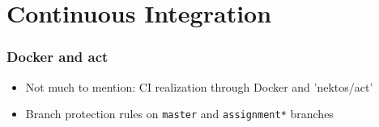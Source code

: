 \section{Continuous Integration}

\begin{frame}
    \frametitle{Docker and act}

    \begin{itemize}
        \item Not much to mention: CI realization through Docker and 'nektos/act'
        \item Branch protection rules on \verb|master| and \verb|assignment*| branches
    \end{itemize}

\end{frame}